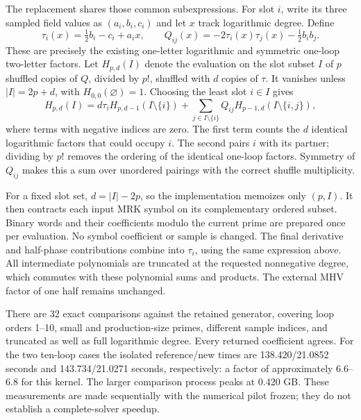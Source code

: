 \documentclass[11pt]{article}
\begin{document}
The replacement shares those common subexpressions. For slot $i$, write its
three sampled field values as $(a_i,b_i,c_i)$ and let $x$ track logarithmic
degree. Define
\[
 \tau_i(x)=\tfrac12 b_i-c_i+a_i x,
 \qquad Q_{ij}(x)=-2\tau_i(x)\tau_j(x)-\tfrac12 b_i b_j.
\]
These are precisely the existing one-letter logarithmic and symmetric
one-loop two-letter factors. Let $H_{p,d}(I)$ denote the evaluation on the
slot subset $I$ of $p$ shuffled copies of $Q$, divided by $p!$, shuffled
with $d$ copies of $\tau$. It vanishes unless $|I|=2p+d$, with
$H_{0,0}(\varnothing)=1$. Choosing the least slot $i\in I$ gives
\[
 H_{p,d}(I)=d\tau_i H_{p,d-1}(I\setminus\{i\})
 +\sum_{j\in I\setminus\{i\}} Q_{ij}
 H_{p-1,d}(I\setminus\{i,j\}),
\]
where terms with negative indices are zero. The first term counts the $d$
identical logarithmic factors that could occupy $i$. The second pairs $i$
with its partner; dividing by $p!$ removes the ordering of the identical
one-loop factors. Symmetry of $Q_{ij}$ makes this a sum over unordered
pairings with the correct shuffle multiplicity.

For a fixed slot set, $d=|I|-2p$, so the implementation memoizes only
$(p,I)$. It then contracts each input MRK symbol on its complementary ordered
subset. Binary words and their coefficients modulo the current prime are
prepared once per evaluation. No symbol coefficient or sample is changed.
The final derivative and half-phase contributions combine into $\tau_i$,
using the same expression above. All intermediate polynomials are truncated
at the requested nonnegative degree, which commutes with these polynomial
sums and products. The external MHV factor of one half remains unchanged.

There are 32 exact comparisons against the retained generator, covering
loop orders 1--10, small and production-size primes, different sample
indices, and truncated as well as full logarithmic degree. Every returned
coefficient agrees. For the two ten-loop cases the isolated reference/new
times are 138.420/21.0852 seconds and 143.734/21.0271 seconds, respectively:
a factor of approximately 6.6--6.8 for this kernel. The larger comparison
process peaks at 0.420 GB. These measurements are made sequentially with
the numerical pilot frozen; they do not establish a complete-solver speedup.
\end{document}
